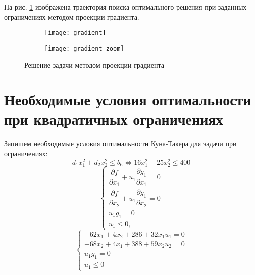 
На рис. \ref{fig:gradient} изображена траектория поиска оптимального решения при заданных ограничениях методом проекции градиента.
\vspace{-0.5cm}
\begin{figure}[H]
\begin{center}
	\begin{subfigure}[b]{0.49\textwidth}
		\texttt{[image: gradient]}
	\end{subfigure}
	\begin{subfigure}[b]{0.49\textwidth}
		\texttt{[image: gradient\_zoom]}
	\end{subfigure}
	\caption{Решение задачи методом проекции градиента}
	\label{fig:gradient}
\end{center}
\end{figure}

\section{Необходимые условия оптимальности при квадратичных ограничениях}

Запишем необходимые условия оптимальности Куна-Такера для задачи при ограничениях:
\begin{equation*}
d_1 x_1^2 + d_2 x_2^2 \leq b_6
\Longleftrightarrow
16 x_1^2 + 25 x_2^2 \leq 400
\end{equation*}
\begin{equation*}
\begin{cases}
	\dfrac{\partial f}{\partial x_1} + u_1 \dfrac{\partial g_1}{\partial x_1}  = 0 \\[0.3cm]
	\dfrac{\partial f}{\partial x_2} + u_1 \dfrac{\partial g_1}{\partial x_2}  = 0 \\
	u_1 g_1 = 0 \\
	u_1 \leq 0,
\end{cases}
\end{equation*}
\begin{equation*}
\begin{cases}
	-62 x_1 + 4 x_2 + 286 + 32 x_1 u_1 = 0 \\[0.3cm]
	-68 x_2 + 4 x_1 + 388 + 59 x_2 u_2 = 0 \\
	u_1 g_1 = 0 \\
	u_1 \leq 0
\end{cases}
\end{equation*}

